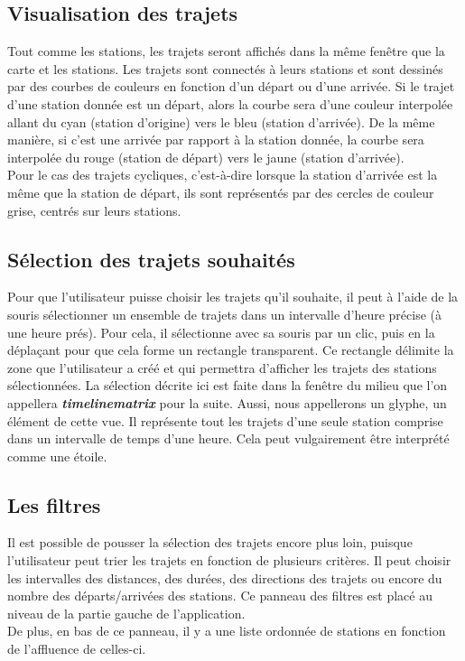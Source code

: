 \documentclass[12pt]{article}
\begin{document}
		\subsection{Visualisation des trajets}
		Tout comme les stations, les trajets seront affichés dans la même fenêtre que la carte et
		les stations. Les trajets sont connectés à leurs stations et sont dessinés par des courbes
		de couleurs en fonction d'un départ ou d'une arrivée. Si le trajet d'une station donnée est
		un départ, alors la courbe sera d'une couleur interpolée allant du cyan (station d'origine)
		vers le bleu (station d'arrivée). De la même manière, si c'est une arrivée par rapport à la
		station donnée, la courbe sera interpolée du rouge (station de départ) vers le jaune
		(station d'arrivée).\\
		Pour le cas des trajets cycliques, c'est-à-dire lorsque la station d'arrivée est la même que la station de départ, ils sont représentés
		par des cercles de couleur grise, centrés sur leurs stations.
	
		\subsection{Sélection des trajets souhaités}
		Pour que l'utilisateur puisse choisir les trajets qu'il souhaite, il peut à l'aide de la
		souris sélectionner un ensemble de trajets dans un intervalle d'heure précise (à une
		heure prés). Pour cela, il sélectionne avec sa souris par un clic, puis en la 
		déplaçant pour que cela forme un rectangle transparent. Ce rectangle délimite la zone
		que l'utilisateur a créé et qui permettra d'afficher les trajets des stations
		sélectionnées. La sélection décrite ici est faite dans la fenêtre du milieu que l'on
		appellera \textbf{\textit{timelinematrix}} pour la suite. Aussi, nous appellerons
		un glyphe, un élément de cette vue. Il représente tout les trajets d'une seule station
		comprise dans un intervalle de temps d'une heure. Cela peut vulgairement être interprété
		comme une étoile.
		
		\subsection{Les filtres}
		Il est possible de pousser la sélection des trajets encore plus loin, puisque l'utilisateur
		peut trier les trajets en fonction de plusieurs critères. Il peut choisir les intervalles
		des distances, des durées, des directions des trajets ou encore du nombre des
		départs/arrivées des stations. Ce panneau des filtres est placé au niveau de la partie gauche
		de l'application.\\
		De plus, en bas de ce panneau, il y a une liste ordonnée de stations en fonction
		de l'affluence de celles-ci.
	
\end{document}
